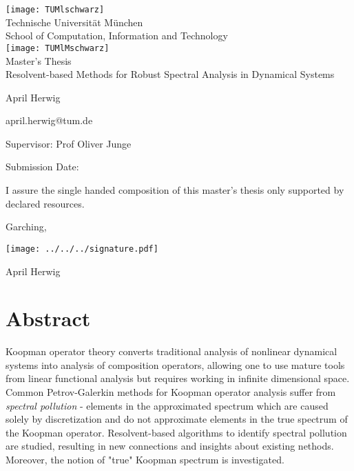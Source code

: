 \pagestyle{empty}
\begin{titlepage}
\begin{center}
\texttt{[image: TUMlschwarz]}\\[3mm]
\sf
{\Large
  Technische Universit\"at M\"unchen\\[5mm]
  School of Computation, Information and Technology\\[8mm]
}
\normalsize
\texttt{[image: TUMlMschwarz]}\\[15mm]

Master's Thesis\\[15mm]

{\LARGE
  Resolvent-based Methods for Robust Spectral Analysis in Dynamical Systems
}
\bigskip

\normalsize

April Herwig

april.herwig@tum.de
\end{center}
\vspace*{75mm}

Supervisor: Prof Oliver Junge
\medskip

Submission Date:  %

\end{titlepage}

\vspace*{150mm}

I assure the single handed composition of this master's thesis only supported by declared resources.
\bigskip

Garching, %

\texttt{[image: ../../../signature.pdf]}

April Herwig
\newpage

\section*{Abstract}

Koopman operator theory converts traditional analysis of nonlinear dynamical systems into 
analysis of composition operators, allowing one to use mature tools from linear functional 
analysis but requires working in infinite dimensional space. Common Petrov-Galerkin 
methods for Koopman operator analysis suffer from \emph{spectral pollution} - elements 
in the approximated spectrum which are caused solely by discretization and do not 
approximate elements in the true spectrum of the Koopman operator. Resolvent-based 
algorithms to identify spectral pollution are studied, resulting in new connections and 
insights about existing nethods. Moreover, the notion of "true" Koopman spectrum is 
investigated. 
